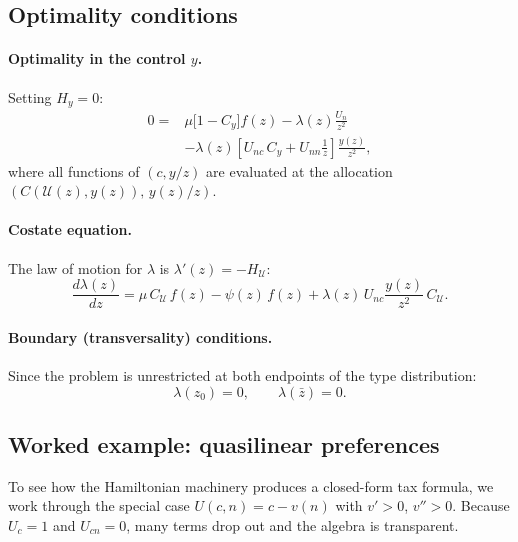 \documentclass[12pt,a4paper]{article}
\theoremstyle{definition}
\theoremstyle{plain}
\theoremstyle{remark}
\newcommand{\zbar}{\bar{z}}
\newcommand{\zlow}{z_{\scriptscriptstyle 0}}
\newcommand{\calU}{\mathcal{U}}
\begin{document}
\subsection{Optimality conditions}

\paragraph{Optimality in the control $y$.} Setting $H_y = 0$:
\begin{equation}
\label{eq:Hy}
\begin{split}
  0 = {} & \mu \bigl[ 1 - C_y \bigr] f(z)
    - \lambda(z) \frac{U_n}{z^2} \\
    & - \lambda(z) \left[ U_{nc} \, C_y
      + U_{nn} \frac{1}{z} \right] \frac{y(z)}{z^2},
\end{split}
\end{equation}
where all functions of $(c, y/z)$ are evaluated at the allocation $(C(\calU(z), y(z)), \, y(z)/z)$.

\paragraph{Costate equation.} The law of motion for $\lambda$ is $\lambda'(z) = -H_{\calU}$:
\begin{equation}
\label{eq:costate}
  \frac{d\lambda(z)}{dz} =
    \mu \, C_{\calU} \, f(z) - \psi(z) \, f(z)
    + \lambda(z) \, U_{nc} \frac{y(z)}{z^2} \, C_{\calU}.
\end{equation}

\paragraph{Boundary (transversality) conditions.} Since the problem is unrestricted at both endpoints of the type distribution:
\begin{equation}
\label{eq:boundary}
  \lambda(\zlow) = 0, \qquad \lambda(\zbar) = 0.
\end{equation}

\subsection{Worked example: quasilinear preferences}
\label{sec:QL_example}

To see how the Hamiltonian machinery produces a closed-form tax formula, we work through the special case $U(c,n) = c - v(n)$ with $v' > 0$, $v'' > 0$. Because $U_c = 1$ and $U_{cn} = 0$, many terms drop out and the algebra is transparent.
\end{document}
